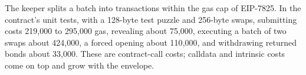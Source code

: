 The keeper splits a batch into transactions within the gas cap of EIP-7825. In the contract's unit tests, with a 128-byte test puzzle and 256-byte swaps, submitting costs 219{,}000 to 295{,}000 gas, revealing about 75{,}000, executing a batch of two swaps about 424{,}000, a forced opening about 110{,}000, and withdrawing returned bonds about 33{,}000. These are contract-call costs; calldata and intrinsic costs come on top and grow with the envelope.
